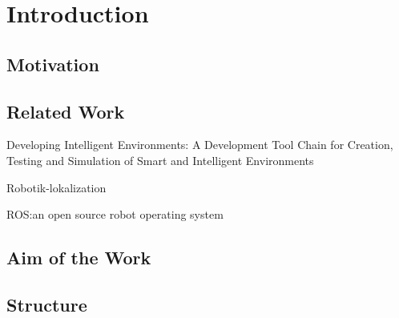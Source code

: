 \chapter{Introduction}\label{ch:introduction}

\section{Motivation}\label{sec:motivation}
\section{Related Work}\label{sec:related-work}
Developing Intelligent Environments: A Development Tool Chain for Creation, Testing and Simulation of Smart and Intelligent Environments\cite{roalter2011developing}

Robotik-lokalization\cite{MooreStouchKeneralizedEkf2014}

ROS:\@ an open source robot operating system\cite{Quigley2009ROSAO}

\section{Aim of the Work}\label{sec:aimOfTheWork}
\section{Structure}\label{sec:structure}

